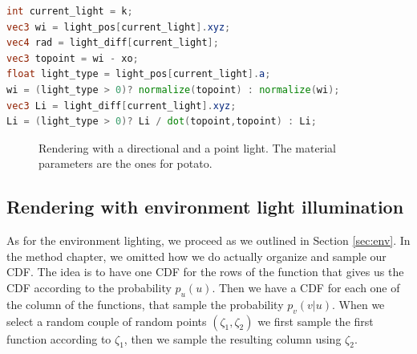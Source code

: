 \begin{lstlisting}[language=GLSL,label=lst:multilighttype,caption={GLSL Code to calculate the radiance \gl{Li} and the incoming light direction \gl{wi} for the k-th directional or point light source.}]
int current_light = k;
vec3 wi = light_pos[current_light].xyz;
vec4 rad = light_diff[current_light];
vec3 topoint = wi - xo;
float light_type = light_pos[current_light].a;
wi = (light_type > 0)? normalize(topoint) : normalize(wi);
vec3 Li = light_diff[current_light].xyz;
Li = (light_type > 0)? Li / dot(topoint,topoint) : Li;
\end{lstlisting}
\begin{figure}[!h]
\centering
{}
\caption{Rendering with a directional and a point light. The material parameters are the ones for potato.}
\label{fig:dir_point_comparison}
\end{figure}
\FloatBarrier
\subsection{Rendering with environment light illumination}
\label{sec:envenv}
As for the environment lighting, we proceed as we outlined in Section \ref{sec:env}. In the method chapter, we omitted how we do actually organize and sample our CDF. The idea is to have one CDF for the rows of the function that gives us the CDF according to the probability $p_u(u)$. Then we have a CDF for each one of the column of the functions, that sample the probability $p_v(v|u)$. When we select a random couple of random points $(\zeta_1,\zeta_2)$ we first sample the first function according to $\zeta_1$, then we sample the resulting column using $\zeta_2$.

